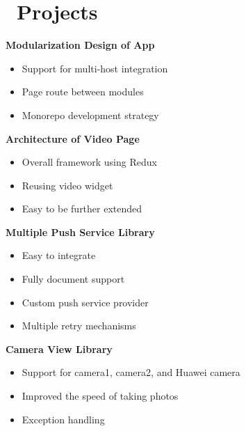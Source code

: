 \documentclass{resume}
\begin{document}
    \section{\faFileCodeO\ Projects}
    \begin{multicols}{2}   %
        \textbf{Modularization Design of App}
        \begin{itemize}
            \item Support for multi-host integration
            \item Page route between modules
            \item Monorepo development strategy
        \end{itemize}

        \textbf{Architecture of Video Page}
        \begin{itemize}
            \item Overall framework using Redux
            \item Reusing video widget
            \item Easy to be further extended
        \end{itemize}

        \textbf{Multiple Push Service Library}
        \begin{itemize}
            \item Easy to integrate
            \item Fully document support
            \item Custom push service provider
            \item Multiple retry mechanisms
        \end{itemize}

        \textbf{Camera View Library}
        \begin{itemize}
            \item Support for camera1, camera2, and Huawei camera
            \item Improved the speed of taking photos
            \item Exception handling
        \end{itemize}
    \end{multicols}

\end{document}
